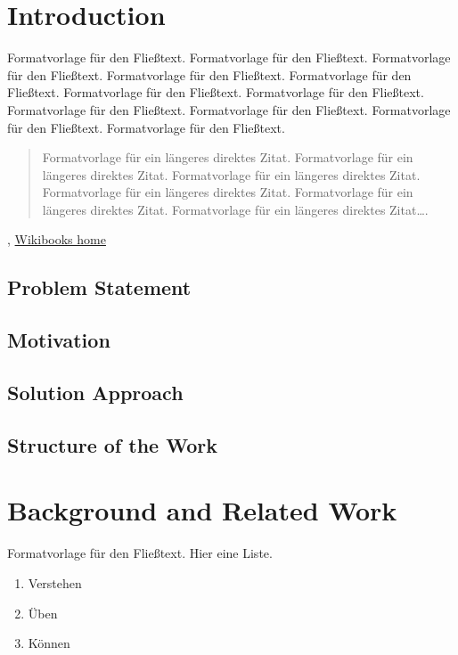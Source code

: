 \documentclass[a4paper,12pt,twoside]{scrreprt}
\begin{document}
\chapter{Introduction}
Formatvorlage für den Fließtext. Formatvorlage für den Fließtext. Formatvorlage für den Fließtext. Formatvorlage für den Fließtext. Formatvorlage für den Fließtext. Formatvorlage für den Fließtext. Formatvorlage für den Fließtext. Formatvorlage für den Fließtext. Formatvorlage für den Fließtext. Formatvorlage für den Fließtext. Formatvorlage für den Fließtext.
\begin{quote}
  Formatvorlage für ein längeres direktes Zitat. Formatvorlage für ein längeres direktes Zitat. Formatvorlage für ein längeres direktes Zitat. Formatvorlage für ein längeres direktes Zitat. Formatvorlage für ein längeres direktes Zitat. Formatvorlage für ein längeres direktes Zitat….
\end{quote}

, \href{https://www.wikibooks.org}{Wikibooks home}

\section{Problem Statement}

\section{Motivation}

\section{Solution Approach}

\section{Structure of the Work}


\chapter{Background and Related Work}
Formatvorlage für den Fließtext.
Hier eine Liste.
\begin{enumerate}
 \item Verstehen
 \item Üben
 \item Können
\end{enumerate}
\end{document}
